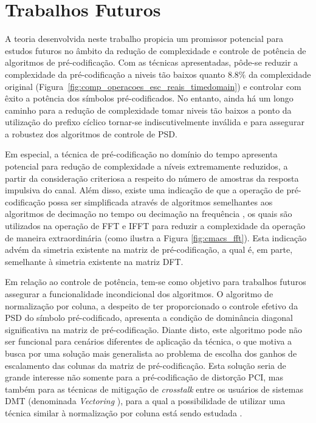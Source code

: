 \section{Trabalhos Futuros}

A teoria desenvolvida neste trabalho propicia um promissor potencial para estudos futuros no âmbito da redução de complexidade e controle de potência de algoritmos de pré-codificação. Com as técnicas apresentadas, pôde-se reduzir a complexidade da pré-codificação a niveis tão baixos quanto $8.8\%$ da complexidade original (Figura~\ref{fig:comp_operacoes_esc_reais_timedomain}) e controlar com êxito a potência dos símbolos pré-codificados. No entanto, ainda há um longo caminho para a redução de complexidade tomar niveis tão baixos a ponto da utilização do prefixo cíclico tornar-se indiscutivelmente inválida e para assegurar a robustez dos algoritmos de controle de PSD.

Em especial, a técnica de pré-codificação no domínio do tempo apresenta potencial para redução de complexidade a níveis extremamente reduzidos, a partir da consideração criteriosa a respeito do número de amostras da resposta impulsiva do canal. Além disso, existe uma indicação de que a operação de pré-codificação possa ser simplificada através de algoritmos semelhantes aos algoritmos de decimação no tempo ou decimação na frequência \cite{oppenheim1998}, os quais são utilizados na operação de FFT e IFFT para reduzir a complexidade da operação de maneira extraordinária (como ilustra a Figura \ref{fig:cmacs_fft}). Esta indicação advém da simetria existente na matriz de pré-codificação, a qual é, em parte, semelhante à simetria existente na matriz DFT.

Em relação ao controle de potência, tem-se como objetivo para trabalhos futuros assegurar a funcionalidade incondicional dos algoritmos. O algoritmo de normalização por coluna, a despeito de ter proporcionado o controle efetivo da PSD do símbolo pré-codificado, apresenta a condição de dominância diagonal significativa na matriz de pré-codificação. Diante disto, este algoritmo pode não ser funcional para cenários diferentes de aplicação da técnica, o que motiva a busca por uma solução mais generalista ao problema de escolha dos ganhos de escalamento das colunas da matriz de pré-codificação. Esta solução seria de grande interesse não somente para a pré-codificação de distorção PCI, mas também para as técnicas de mitigação de \emph{crosstalk} entre os usuários de sistemas DMT (denominada \emph{Vectoring} \cite{cendrillon2007}), para a qual a possibilidade de utilizar uma técnica similar à normalização por coluna está sendo estudada \cite{itutq4046}.